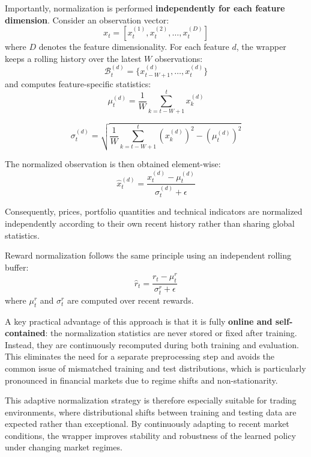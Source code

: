 Importantly, normalization is performed \textbf{independently for each feature
dimension}. Consider an observation vector:
\[
x_t =
[x_t^{(1)}, x_t^{(2)}, \dots, x_t^{(D)}]
\]
where $D$ denotes the feature dimensionality. For each feature $d$, the wrapper keeps
a rolling history over the latest $W$ observations:
\[
\mathcal{B}_t^{(d)}
=
\{x_{t-W+1}^{(d)},\dots,x_t^{(d)}\}
\]
and computes feature-specific statistics:
\[
\mu_t^{(d)}
=
\frac{1}{W}
\sum_{k=t-W+1}^{t}
x_k^{(d)}
\]

\[
\sigma_t^{(d)}
=
\sqrt{
\frac{1}{W}
\sum_{k=t-W+1}^{t}
(x_k^{(d)})^2
-
(\mu_t^{(d)})^2
}
\]

The normalized observation is then obtained element-wise:
\[
\hat{x}_t^{(d)}
=
\frac{
x_t^{(d)}-\mu_t^{(d)}
}
{
\sigma_t^{(d)}+\epsilon
}
\]

Consequently, prices, portfolio quantities and technical indicators are normalized
independently according to their own recent history rather than sharing global
statistics.

Reward normalization follows the same principle using an independent rolling buffer:
\[
\hat{r}_t
=
\frac{r_t-\mu_t^r}
{\sigma_t^r+\epsilon
}
\]
where $\mu_t^r$ and $\sigma_t^r$ are computed over recent rewards.

A key practical advantage of this approach is that it is fully \textbf{online and
self-contained}: the normalization statistics are never stored or fixed after training.
Instead, they are continuously recomputed during both training and evaluation. This
eliminates the need for a separate preprocessing step and avoids the common issue of
mismatched training and test distributions, which is particularly pronounced in
financial markets due to regime shifts and non-stationarity.

This adaptive normalization strategy is therefore especially suitable for trading
environments, where distributional shifts between training and testing data are
expected rather than exceptional. By continuously adapting to recent market conditions,
the wrapper improves stability and robustness of the learned policy under changing
market regimes.